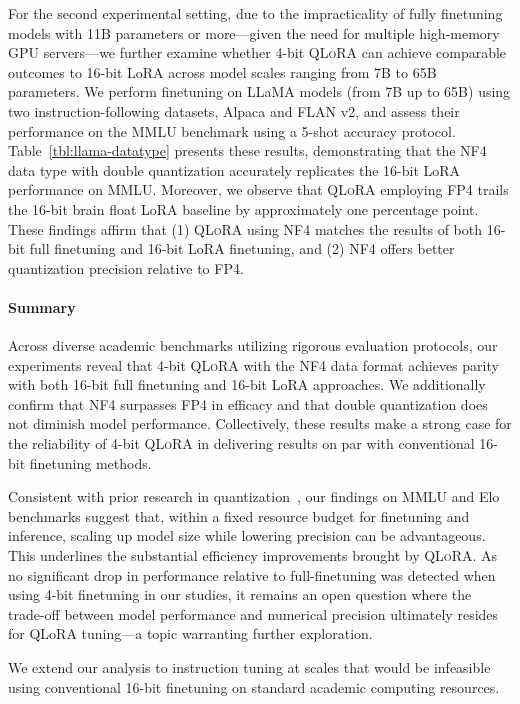For the second experimental setting, due to the impracticality of fully finetuning models with 11B parameters or more—given the need for multiple high-memory GPU servers—we further examine whether 4-bit \textsc{QLoRA} can achieve comparable outcomes to 16-bit LoRA across model scales ranging from 7B to 65B parameters. We perform finetuning on LLaMA models (from 7B up to 65B) using two instruction-following datasets, Alpaca and FLAN v2, and assess their performance on the MMLU benchmark using a 5-shot accuracy protocol. Table~\ref{tbl:llama-datatype} presents these results, demonstrating that the NF4 data type with double quantization accurately replicates the 16-bit LoRA performance on MMLU. Moreover, we observe that \textsc{QLoRA} employing FP4 trails the 16-bit brain float LoRA baseline by approximately one percentage point. These findings affirm that (1) \textsc{QLoRA} using NF4 matches the results of both 16-bit full finetuning and 16-bit LoRA finetuning, and (2) NF4 offers better quantization precision relative to FP4.

\paragraph{Summary} Across diverse academic benchmarks utilizing rigorous evaluation protocols, our experiments reveal that 4-bit \textsc{QLoRA} with the NF4 data format achieves parity with both 16-bit full finetuning and 16-bit LoRA approaches. We additionally confirm that NF4 surpasses FP4 in efficacy and that double quantization does not diminish model performance. Collectively, these results make a strong case for the reliability of 4-bit \textsc{QLoRA} in delivering results on par with conventional 16-bit finetuning methods.

Consistent with prior research in quantization~\citep{dettmers2022case}, our findings on MMLU and Elo benchmarks suggest that, within a fixed resource budget for finetuning and inference, scaling up model size while lowering precision can be advantageous. This underlines the substantial efficiency improvements brought by \textsc{QLoRA}. As no significant drop in performance relative to full-finetuning was detected when using 4-bit finetuning in our studies, it remains an open question where the trade-off between model performance and numerical precision ultimately resides for QLoRA tuning—a topic warranting further exploration.

We extend our analysis to instruction tuning at scales that would be infeasible using conventional 16-bit finetuning on standard academic computing resources.

